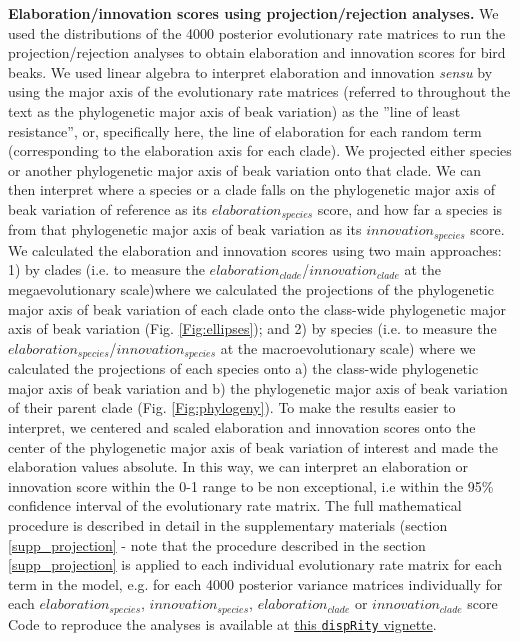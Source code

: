 \documentclass[12pt,letterpaper]{article}
\begin{document}
\textbf{Elaboration/innovation scores using projection/rejection analyses.} We used the distributions of the 4000 posterior evolutionary rate matrices to run the projection/rejection analyses to obtain elaboration and innovation scores for bird beaks.
We used linear algebra to interpret elaboration and innovation \textit{sensu} \cite{endler2005animal} by using the major axis of the evolutionary rate matrices (referred to throughout the text as the phylogenetic major axis of beak variation) as the ''line of least resistance'', or, specifically here, the line of elaboration for each random term (corresponding to the elaboration axis for each clade).
We projected either species or another phylogenetic major axis of beak variation onto that clade.
We can then interpret where a species or a clade falls on the phylogenetic major axis of beak variation of reference as its $elaboration_{species}$ score, and how far a species is from that phylogenetic major axis of beak variation as its $innovation_{species}$ score.
We calculated the elaboration and innovation scores using two main approaches: 1) by clades (i.e.
to measure the $elaboration_{clade}$/$innovation_{clade}$ at the megaevolutionary scale)where we calculated the projections of the phylogenetic major axis of beak variation of each clade onto the class-wide phylogenetic major axis of beak variation (Fig. \ref{Fig:ellipses}); and 2) by species (i.e.
to measure the $elaboration_{species}$/$innovation_{species}$ at the macroevolutionary scale) where we calculated the projections of each species onto a) the class-wide phylogenetic major axis of beak variation and b) the phylogenetic major axis of beak variation of their parent clade (Fig. \ref{Fig:phylogeny}).
To make the results easier to interpret, we centered and scaled elaboration and innovation scores onto the center of the phylogenetic major axis of beak variation of interest and made the elaboration values absolute.
In this way, we can interpret an elaboration or innovation score within the 0-1 range to be non exceptional, i.e within the 95\% confidence interval of the evolutionary rate matrix.
The full mathematical procedure is described in detail in the supplementary materials (section \ref{supp_projection} - note that the procedure described in the section \ref{supp_projection} is applied to each individual evolutionary rate matrix for each term in the model, e.g. for each 4000 posterior variance matrices individually for each $elaboration_{species}$, $innovation_{species}$, $elaboration_{clade}$ or $innovation_{clade}$ score %
Code to reproduce the analyses is available at \href{https://raw.rawgit.net/TGuillerme/dispRity/master/inst/vignettes/Projection_analysis.html}{this \texttt{dispRity} vignette}.
\end{document}
